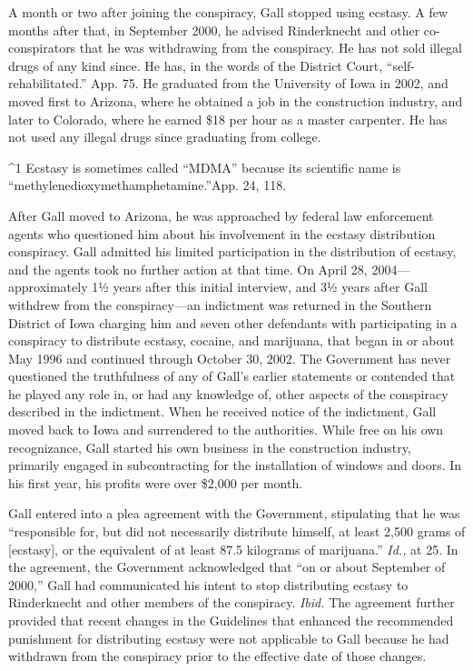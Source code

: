   A month or two after joining the conspiracy, Gall stopped using
ecstasy. A few months after that, in September 2000, he advised
Rinderknecht and other co-conspirators that he was withdrawing from the
conspiracy. He has not sold illegal drugs of any kind since. He has, in
the words of the District Court, ``self-rehabilitated.'' App. 75. He
graduated from the University of Iowa in 2002, and moved first to \newpage 
Arizona, where he obtained a job in the construction industry, and later
to Colorado, where he earned \$18 per hour as a master carpenter. He has
not used any illegal drugs since graduating from college.


^1 Ecstasy is sometimes called ``MDMA'' because its scientific name is
``methylenedioxymethamphetamine.''App. 24, 118.

  After Gall moved to Arizona, he was approached by federal law
enforcement agents who questioned him about his involvement in the
ecstasy distribution conspiracy. Gall admitted his limited participation
in the distribution of ecstasy, and the agents took no further action
at that time. On April 28, 2004---approximately 1½ years after
this initial interview, and 3½ years after Gall withdrew from the
conspiracy---an indictment was returned in the Southern District of
Iowa charging him and seven other defendants with participating in a
conspiracy to distribute ecstasy, cocaine, and marijuana, that began in
or about May 1996 and continued through October 30, 2002. The Government
has never questioned the truthfulness of any of Gall's earlier
statements or contended that he played any role in, or had any knowledge
of, other aspects of the conspiracy described in the indictment. When
he received notice of the indictment, Gall moved back to Iowa and
surrendered to the authorities. While free on his own recognizance, Gall
started his own business in the construction industry, primarily engaged
in subcontracting for the installation of windows and doors. In his
first year, his profits were over \$2,000 per month.

  Gall entered into a plea agreement with the Government, stipulating
that he was ``responsible for, but did not necessarily distribute
himself, at least 2,500 grams of [ecstasy], or the equivalent of at
least 87.5 kilograms of marijuana.'' \emph{Id.,} at 25. In the
agreement, the Government acknowledged that ``on or about September of
2000,'' Gall had communicated his intent to stop distributing ecstasy
to Rinderknecht and other members of the conspiracy. \emph{Ibid.} The
agreement further provided that recent changes in the Guidelines that
enhanced the recommended punishment for distributing ecstasy were not
applicable to Gall because he had with\newpage drawn from the conspiracy
prior to the effective date of those changes.

